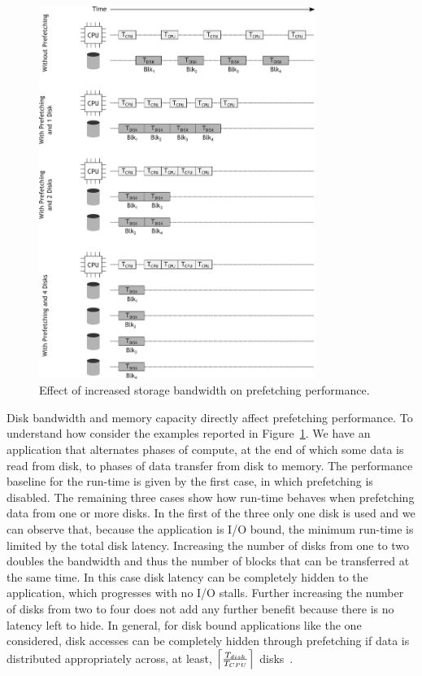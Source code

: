\begin{figure}[!htb]
\centering
\includegraphics[width=0.8\textwidth]{figures/prefetching}
\caption{Effect of increased storage bandwidth on prefetching performance.}
\label{figure: prefetching}
\end{figure}

Disk bandwidth and memory capacity directly affect prefetching performance. To understand how consider the examples reported in Figure~\ref{figure: prefetching}. We have an application that alternates phases of compute, at the 
end of which some data is read from disk, to phases of data transfer from disk to memory. The performance baseline for the run-time is given by the first case, in which prefetching is disabled. The remaining three cases show 
how run-time behaves when prefetching data from one or more disks. In the first of the three only one disk is used and we can observe that, because the application is I/O bound, the minimum run-time is limited by the total disk 
latency. Increasing the number of disks from one to two doubles the bandwidth and thus the number of blocks that can be transferred at the same time. In this case disk latency can be completely hidden to the application, which 
progresses with no I/O stalls. Further increasing the number of disks from two to four does not add any further benefit because there is no latency left to hide. In general, for disk bound applications like the one considered, 
disk accesses can be completely hidden through prefetching if data is distributed appropriately across, at least, $\ceil*{\frac{T_{disk}}{T_{CPU}}}$ disks~\cite{Chang2001}.

